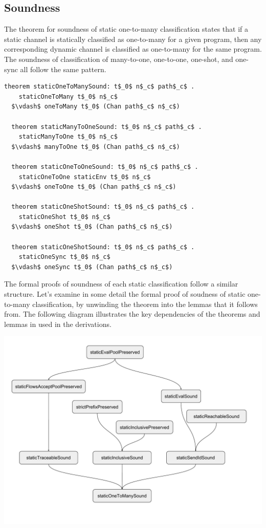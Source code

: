 \documentclass[letterpaper, 11pt]{extarticle}
\begin{document}
\subsection{Soundness}

The theorem for soundness of static one-to-many classification states that if a static channel is
statically classified as one-to-many for a given program,
then any corresponding dynamic channel is classified
as one-to-many for the same program.
The soundness of classification of many-to-one, one-to-one, one-shot, and one-sync
all follow the same pattern.

\begin{lstlisting}[language=logic, mathescape]
  theorem staticOneToManySound: t$_0$ n$_c$ path$_c$ . 
    staticOneToMany t$_0$ n$_c$
  $\vdash$ oneToMany t$_0$ (Chan path$_c$ n$_c$)

  theorem staticManyToOneSound: t$_0$ n$_c$ path$_c$ . 
    staticManyToOne t$_0$ n$_c$
  $\vdash$ manyToOne t$_0$ (Chan path$_c$ n$_c$)

  theorem staticOneToOneSound: t$_0$ n$_c$ path$_c$ . 
    staticOneToOne staticEnv t$_0$ n$_c$
  $\vdash$ oneToOne t$_0$ (Chan path$_c$ n$_c$)

  theorem staticOneShotSound: t$_0$ n$_c$ path$_c$ .
    staticOneShot t$_0$ n$_c$
  $\vdash$ oneShot t$_0$ (Chan path$_c$ n$_c$)

  theorem staticOneShotSound: t$_0$ n$_c$ path$_c$ .
    staticOneSync t$_0$ n$_c$
  $\vdash$ oneSync t$_0$ (Chan path$_c$ n$_c$)
\end{lstlisting}

The formal proofs of soundness of each static classification follow a similar structure.
Let's examine in some detail the formal proof of soudness of static one-to-many classification,
by unwinding the theorem into the lemmas that it follows from. The following diagram illustrates
the key dependencies of the theorems and lemmas in used in the derivations.

\includegraphics[width=1\textwidth]{cml-proof-low.pdf}
\end{document}
